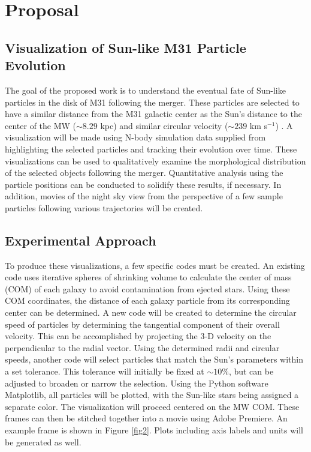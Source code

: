 \documentclass[twocolumn]{aastex631}
\begin{document}
\section{Proposal} \label{sec:proposal}
\subsection{Visualization of Sun-like M31 Particle Evolution}
The goal of the proposed work is to understand the eventual fate of Sun-like particles in the disk of M31 following the merger. These particles are selected to have a similar distance from the M31 galactic center as the Sun's distance to the center of the MW ($\sim 8.29$ kpc) and similar circular velocity ($\sim 239$ km s$^{-1}$) \citep{2012ApJ...753....8V}. A visualization will be made using N-body simulation data supplied from \citet{2012ApJ...753....9V} highlighting the selected particles and tracking their evolution over time. These visualizations can be used to qualitatively examine the morphological distribution of the selected objects following the merger. Quantitative analysis using the particle positions can be conducted to solidify these results, if necessary. In addition, movies of the night sky view from the perspective of a few sample particles following various trajectories will be created.

\subsection{Experimental Approach}
To produce these visualizations, a few specific codes must be created. An existing code uses iterative spheres of shrinking volume to calculate the center of mass (COM) of each galaxy to avoid contamination from ejected stars. Using these COM coordinates, the distance of each galaxy particle from its corresponding center can be determined. A new code will be created to determine the circular speed of particles by determining the tangential component of their overall velocity. This can be accomplished by projecting the 3-D velocity on the perpendicular to the radial vector. Using the determined radii and circular speeds, another code will select particles that match the Sun's parameters within a set tolerance. This tolerance will initially be fixed at $\sim 10\%$, but can be adjusted to broaden or narrow the selection. Using the Python software Matplotlib, all particles will be plotted, with the Sun-like stars being assigned a separate color. The visualization will proceed centered on the MW COM. These frames can then be stitched together into a movie using Adobe Premiere. An example frame is shown in Figure \ref{fig2}. Plots including axis labels and units will be generated as well.
\end{document}

